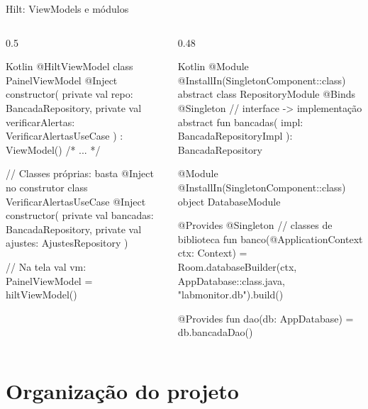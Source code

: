\documentclass[aspectratio=169,10pt]{beamer}
\begin{document}
\begin{frame}[fragile]{Hilt: ViewModels e módulos}
  \begin{columns}[T]
    \begin{column}{0.5\textwidth}
\begin{codigo}[title=ViewModel injetado]{Kotlin}
@HiltViewModel
class PainelViewModel @Inject constructor(
  private val repo: BancadaRepository,
  private val verificarAlertas: VerificarAlertasUseCase
) : ViewModel() { /* ... */ }

// Classes próprias: basta @Inject no construtor
class VerificarAlertasUseCase @Inject constructor(
  private val bancadas: BancadaRepository,
  private val ajustes: AjustesRepository
)

// Na tela
val vm: PainelViewModel = hiltViewModel()
\end{codigo}
    \end{column}
    \begin{column}{0.48\textwidth}
\begin{codigo}[title=di/DataModule.kt]{Kotlin}
@Module
@InstallIn(SingletonComponent::class)
abstract class RepositoryModule {
  @Binds @Singleton   // interface -> implementação
  abstract fun bancadas(
    impl: BancadaRepositoryImpl
  ): BancadaRepository
}

@Module
@InstallIn(SingletonComponent::class)
object DatabaseModule {
  @Provides @Singleton  // classes de biblioteca
  fun banco(@ApplicationContext ctx: Context) =
    Room.databaseBuilder(ctx, AppDatabase::class.java,
      "labmonitor.db").build()

  @Provides fun dao(db: AppDatabase) = db.bancadaDao()
}
\end{codigo}
    \end{column}
  \end{columns}
\end{frame}

\section{Organização do projeto}
\end{document}

